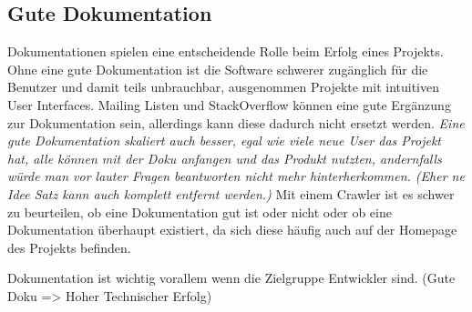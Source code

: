 \subsection{Gute Dokumentation}

\rawidea
Dokumentationen spielen eine entscheidende Rolle beim Erfolg eines Projekts.
Ohne eine gute Dokumentation ist die Software schwerer zugänglich für die Benutzer und damit teils unbrauchbar,
ausgenommen Projekte mit intuitiven User Interfaces.
Mailing Listen und StackOverflow können eine gute Ergänzung zur Dokumentation sein, allerdings kann diese dadurch nicht
ersetzt werden. \textit{Eine gute Dokumentation skaliert auch besser, egal wie viele neue User das Projekt hat, alle können
    mit der Doku anfangen und das Produkt nutzten, andernfalls würde man vor lauter Fragen beantworten
    nicht mehr hinterherkommen. (Eher ne Idee Satz kann auch komplett entfernt werden.)}
Mit einem Crawler ist es schwer zu beurteilen, ob eine Dokumentation gut ist oder nicht oder ob
eine Dokumentation überhaupt existiert, da sich diese häufig auch auf der Homepage des Projekts befinden.

\bigskip


\begin{hypothesis}
    Dokumentation ist wichtig vorallem wenn die Zielgruppe Entwickler sind. 
    (Gute Doku => Hoher Technischer Erfolg) 
\end{hypothesis}